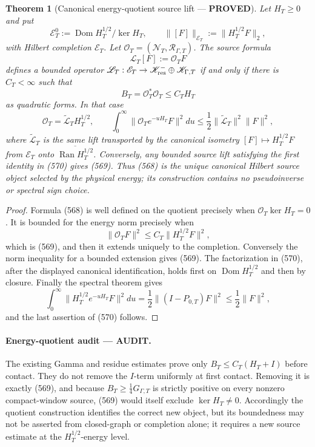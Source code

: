 \documentclass[11pt]{article}
\newtheorem{theorem}{Theorem}
\newcommand{\PROVED}{\textcolor{green!45!black}{\textbf{PROVED}}}
\newcommand{\AUDIT}{\textcolor{orange!75!black}{\textbf{AUDIT}}}
\begin{document}
\begin{theorem}[Canonical energy-quotient source lift --- \PROVED]
Let \(H_T\ge0\) and put
\[
 \mathscr E_T^0:=\operatorname{Dom}H_T^{1/2}/\ker H_T,
 \qquad
 \|[F]\|_{\mathscr E_T}:=\|H_T^{1/2}F\|_2,
\]
with Hilbert completion \(\mathscr E_T\).  Let
\(\mathcal O_T=(\mathcal N_T,\mathcal R_{\Gamma,T})\).  The source formula
\begin{equation}
 \mathscr L_T[F]:=\mathcal O_TF                         \tag{568}
\end{equation}
defines a bounded operator
\(\mathscr L_T:\mathscr E_T\to
\mathscr K_{\rm res}^{-}\oplus\mathscr K_{\Gamma,T}\)
if and only if there is \(C_T<\infty\) such that
\begin{equation}
 B_T=\mathcal O_T^*\mathcal O_T\le C_TH_T              \tag{569}
\end{equation}
as quadratic forms.  In that case
\begin{equation}
 \mathcal O_T=\widetilde{\mathscr L}_TH_T^{1/2},
 \qquad
 \int_0^\infty\|\mathcal O_Te^{-uH_T}F\|^2du
 \le\frac12\|\widetilde{\mathscr L}_T\|^2\|F\|^2,   \tag{570}
\end{equation}
where \(\widetilde{\mathscr L}_T\) is the same lift transported by the
canonical isometry
\([F]\mapsto H_T^{1/2}F\) from \(\mathscr E_T\) onto
\(\overline{\operatorname{Ran}H_T^{1/2}}\).
Conversely, any bounded source lift satisfying the first identity in
(570) gives (569).  Thus (568) is the unique canonical Hilbert source
object selected by the physical energy; its construction contains no
pseudoinverse or spectral sign choice.
\end{theorem}

\begin{proof}
Formula (568) is well defined on the quotient precisely when
\(\mathcal O_T\ker H_T=0\).  It is bounded for the energy norm precisely
when
\[
 \|\mathcal O_TF\|^2\le C_T\|H_T^{1/2}F\|^2,
\]
which is (569), and then it extends uniquely to the completion.  Conversely
the norm inequality for a bounded extension gives (569).  The factorization
in (570), after the displayed canonical identification, holds first on
\(\operatorname{Dom}H_T^{1/2}\) and then by closure.
Finally the spectral theorem gives
\[
 \int_0^\infty\|H_T^{1/2}e^{-uH_T}F\|^2du
 =\frac12\|(I-P_{0,T})F\|^2\le\frac12\|F\|^2,
\]
and the last assertion of (570) follows.
\end{proof}

\paragraph{Energy-quotient audit --- \AUDIT.}
The existing Gamma and residue estimates prove only
\(B_T\le C_T(H_T+I)\) before contact.  They do not remove the \(I\)-term
uniformly at first contact.  Removing it is exactly (569), and because
\(B_T\ge\frac14G_{\Gamma,T}\) is strictly positive on every nonzero
compact-window source, (569) would itself exclude \(\ker H_T\ne0\).
Accordingly the quotient construction identifies the correct new object,
but its boundedness may not be asserted from closed-graph or completion
alone; it requires a new source estimate at the \(H_T^{1/2}\)-energy level.
\end{document}

